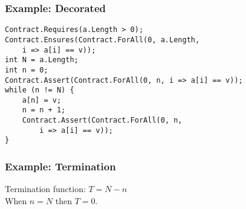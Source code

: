 \begin{frame}[fragile]
    \frametitle{Example: Decorated}
    \begin{verbatim}
Contract.Requires(a.Length > 0);
Contract.Ensures(Contract.ForAll(0, a.Length,
    i => a[i] == v));
int N = a.Length;
int n = 0;
Contract.Assert(Contract.ForAll(0, n, i => a[i] == v));
while (n != N) {
    a[n] = v;
    n = n + 1;
    Contract.Assert(Contract.ForAll(0, n,
        i => a[i] == v));
}
    \end{verbatim}
\end{frame}

\begin{frame}
    \frametitle{Example: Termination}
    Termination function: $T=N-n$ \\
    When $n=N$ then $T=0$.
\end{frame}



